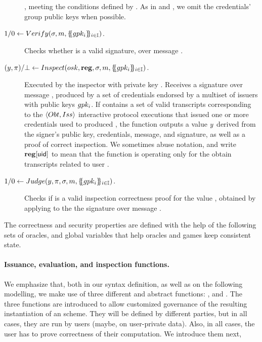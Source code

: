 \begin{description}
  \msg, meeting the conditions defined by \feval. As in \Obtain and \Issue, we
  omit the credentials' group public keys when possible.
\item[$1/0 \gets
  Verify(\sigma,m,\{\mskip-5mu\{ gpk_i \}\mskip-5mu\}_{i \in \mathbb{I}})$.]
  Checks whether \sig is a valid signature, over message \msg.
\item[$(y,\pi)/\bot \gets Inspect(osk,\mathbf{reg},\sigma,m,
  \{\mskip-5mu\{ gpk_i \}\mskip-5mu\}_{i \in \mathbb{I}})$.] %
  Executed by the inspector with private key \osk. Receives a signature \sig
  over message \msg, produced by a set of credentials endorsed by a multiset of
  issuers with public keys $gpk_i$. If \trans contains a set of valid
  transcripts corresponding to the $\langle Obt,Iss\rangle$ interactive
  protocol executions that issued one or more credentials used to produced \sig,
  the function outputs a value $y$ derived from the signer's public key,
  credentials, message, and signature, as well as a proof of correct inspection.
  We sometimes abuse notation, and write $\mathbf{reg}[\mathsf{uid}]$ to mean that the \Inspect
  function is operating only for the obtain transcripts related to user \uid. 
\item[$1/0 \gets Judge(y,\pi,\sigma,m,
  \{\mskip-5mu\{ gpk_i\}\mskip-5mu\}_{i \in \mathbb{I}})$.] %
  Checks if \iproof is a valid inspection correctness proof for the value \y,
  obtained by applying \Inspect to the the signature \sig over message \msg. 
\end{description}

The correctness and security properties are defined with the help of the
following sets of oracles, and global variables that help oracles and games
keep consistent state.

\paragraph{Issuance, evaluation, and inspection functions.} %
We emphasize that, both in our syntax definition, as well as on the following
modelling, we make use of three different and abstract functions: \fissue,
\feval and \finsp. The three functions are introduced to allow customized
governance of the resulting instantiation of an \UAS scheme. They will be
defined by different parties, but in all cases, they are run by users (maybe,
on user-private data). Also, in all cases, the user has to prove correctness of
their computation. We introduce them next, 

